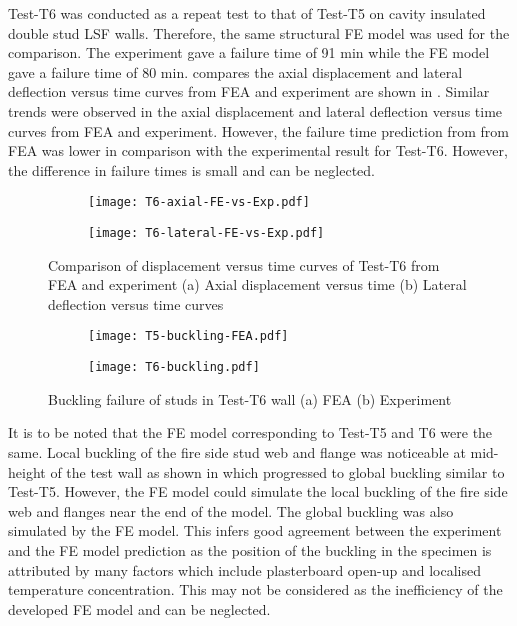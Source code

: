 Test-T6 was conducted as a repeat test to that of Test-T5 on cavity insulated double stud LSF walls. Therefore, the same structural FE model was used for the comparison. The experiment gave a failure time of 91 min while the FE model gave a failure time of 80 min.  compares the axial displacement and lateral deflection versus time curves from FEA and experiment are shown in . Similar trends were observed in the axial displacement and lateral deflection versus time curves from FEA and experiment. However, the failure time prediction from from FEA was lower in comparison with the experimental result for Test-T6. However, the difference in failure times is small and can be neglected.   
\begin{figure}[!htbp]
	\centering
	\begin{subfigure}[b]{0.7\textwidth}
		\centering
		\texttt{[image: T6-axial-FE-vs-Exp.pdf]}
		\caption{}
		\label{subfig:T6-axial-FE-vs-Exp}
	\end{subfigure}
	\begin{subfigure}[b]{0.7\textwidth}
		\centering
		\texttt{[image: T6-lateral-FE-vs-Exp.pdf]}
		\caption{}
		\label{subfig:T6-lateral-FE-vs-Exp}
	\end{subfigure}
	   \caption{Comparison of displacement versus time curves of Test-T6 from FEA and experiment (a) Axial displacement versus time (b) Lateral deflection versus time curves}
	   \label{fig:T6-structural-FE-vs-Exp}
\end{figure}    
\begin{figure}[!htbp]
	\centering
	\begin{subfigure}[b]{0.85\textwidth}
		\centering
		\texttt{[image: T5-buckling-FEA.pdf]}
		\caption{}
		\label{subfig:T6-buckling-FEA}
	\end{subfigure}
	\begin{subfigure}[b]{0.35\textwidth}
		\centering
		\texttt{[image: T6-buckling.pdf]}
		\caption{}
		\label{subfig:T6-buckling-FEA-Exp}
	\end{subfigure}
	   \caption{Buckling failure of studs in Test-T6 wall (a) FEA (b) Experiment}
	   \label{fig:T6-buckling-FE-vs-Exp}
\end{figure} 

It is to be noted that the FE model corresponding to Test-T5 and T6 were the same. Local buckling of the fire side stud web and flange was noticeable at mid-height of the test wall as shown in  which progressed to global buckling similar to Test-T5. However, the FE model could simulate the local buckling of the fire side web and flanges near the end of the model. The global buckling was also simulated by the FE model. This infers good agreement between the experiment and the FE model prediction as the position of the buckling in the specimen is attributed by many factors which include plasterboard open-up and localised temperature concentration. This may not be considered as the inefficiency of the developed FE model and can be neglected.

